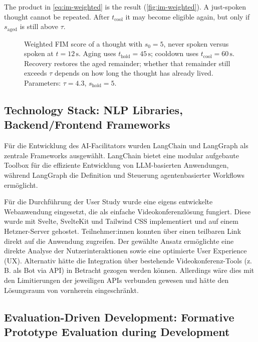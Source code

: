 The product in \eqref{eq:im-weighted} is the result (\autoref{fig:im-weighted}). A just-spoken thought
cannot be repeated. After \(t_{\mathrm{cool}}\) it may become eligible again, but only if
\(s_{\mathrm{aged}}\) is still above \(\tau\).

\begin{figure}[H]
  \centering
  
  \caption{Weighted FIM score of a thought with \(s_0=5\), never spoken versus spoken at
    \(t=12\,\mathrm{s}\). Aging uses \(t_{\mathrm{hold}}=45\,\mathrm{s}\); cooldown uses
    \(t_{\mathrm{cool}}=60\,\mathrm{s}\). Recovery restores the aged remainder; whether that
    remainder still exceeds \(\tau\) depends on how long the thought has already lived.
    Parameters: \(\tau=4.3\), \(s_{\mathrm{hold}}=5\).
  }
  \label{fig:im-weighted}
\end{figure}

\subsection{Technology Stack: NLP Libraries, Backend/Frontend Frameworks}

Für die Entwicklung des AI-Facilitators wurden LangChain und LangGraph als zentrale Frameworks ausgewählt.
LangChain bietet eine modular aufgebaute Toolbox für die effiziente Entwicklung von LLM-basierten
Anwendungen, während LangGraph die Definition und Steuerung agentenbasierter Workflows ermöglicht.

Für die Durchführung der User Study wurde eine eigens entwickelte Webanwendung eingesetzt, die als einfache
Videokonferenzlösung fungiert. Diese wurde mit Svelte, SvelteKit und Tailwind CSS implementiert und auf einem
Hetzner-Server gehostet. Teilnehmer:innen konnten über einen teilbaren Link direkt auf die Anwendung zugreifen.
Der gewählte Ansatz ermöglichte eine direkte Analyse der Nutzerinteraktionen sowie eine optimierte User
Experience (UX). Alternativ hätte die Integration über bestehende Videokonferenz-Tools (z. B. als Bot via
API) in Betracht gezogen werden können. Allerdings wäre dies mit den Limitierungen der jeweiligen APIs
verbunden gewesen und hätte den Lösungsraum von vornherein eingeschränkt.

\subsection{Evaluation-Driven Development: Formative Prototype Evaluation during Development}

